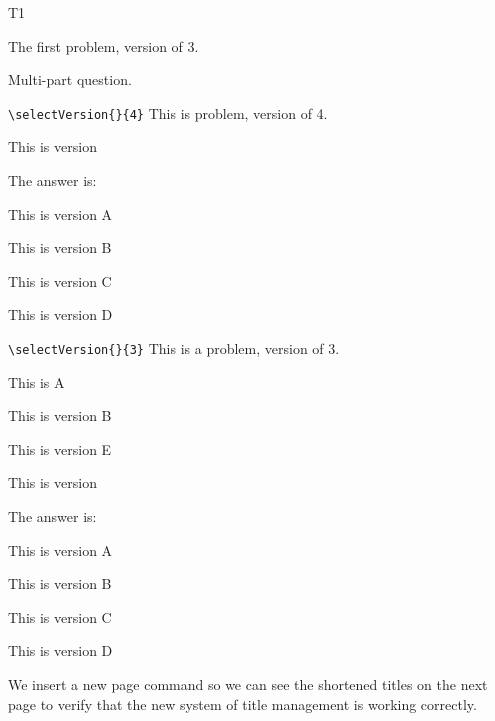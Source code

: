 \documentclass{article}
\begin{document}
\begin{exam}{T1}
\begin{problem}[5]
\begin{solution}
The first problem, version  of 3.
\end{solution}
\end{problem}

\begin{problem*}[2ea]
Multi-part question.
    \begin{parts}
    \item \verb!\selectVersion{}{4}! This is problem, version  of 4.
\begin{solution}
This is version 

The answer is:
\begin{verA}
This is version A
\end{verA}
\begin{verB}
This is version B
\end{verB}
\begin{verC}
This is version C
\end{verC}
\begin{verD}
This is version D
\end{verD}
\end{solution}

    \item \verb!\selectVersion{}{3}! This is a problem, version  of 3.
\begin{verA}
This is A
\end{verA}
\begin{verB}
This is version B
\end{verB}
\begin{verE}
This is version E
\end{verE}

\begin{solution}
This is version 

The answer is:
\begin{verA}
This is version A
\end{verA}
\begin{verB}
This is version B
\end{verB}
\begin{verC}
This is version C
\end{verC}
\begin{verD}
This is version D
\end{verD}
\end{solution}

\pushProblem
\begin{eqComments}
We insert a new page command so we can see the shortened titles on the next page
to verify that the new system of title management is working correctly.
\end{eqComments}
\popProblem




\end{parts}
\end{problem*}
\end{exam}
\end{document}
